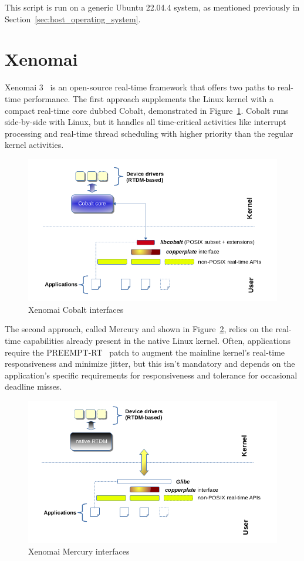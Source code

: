 \documentclass[MMR,Master,english]{twbook}
\begin{document}
\vspace{2em}

\noindent This script is run on a generic Ubuntu 22.04.4 system, as mentioned previously in Section~\ref{sec:host_operating_system}.

\clearpage

\section{Xenomai}\label{sec:xenomai}

Xenomai 3~\cite{XenomaiXenomai} is an open-source real-time framework that offers two paths to real-time performance. The first approach supplements the Linux kernel with a compact real-time core dubbed Cobalt, demonstrated in Figure~\ref{fig:cobalt}. Cobalt runs side-by-side with Linux, but it handles all time-critical activities like interrupt processing and real-time thread scheduling with higher priority than the regular kernel activities.

\begin{figure}[H]
	\centering
	\includegraphics[width=0.6\columnwidth]{img/introduction/xenomai/x3-cobalt-interfaces.png}
	\caption[Xenomai Cobalt interfaces]{Xenomai Cobalt interfaces~\cite{XenomaiXenomai}}
	\label{fig:cobalt}
\end{figure}

\noindent  The second approach, called Mercury and shown in Figure~\ref{fig:mercury}, relies on the real-time capabilities already present in the native Linux kernel. Often, applications require the PREEMPT-RT~\cite{RealtimePreempt_rt_versionsWiki} patch to augment the mainline kernel's real-time responsiveness and minimize jitter, but this isn't mandatory and depends on the application's specific requirements for responsiveness and tolerance for occasional deadline misses.

\begin{figure}[H]
	\centering
	\includegraphics[width=0.6\columnwidth]{img/introduction/xenomai/x3-mercury-interfaces.png}
	\caption[Xenomai Mercury interfaces]{Xenomai Mercury interfaces~\cite{XenomaiXenomai}}
	\label{fig:mercury}
\end{figure}
\end{document}
